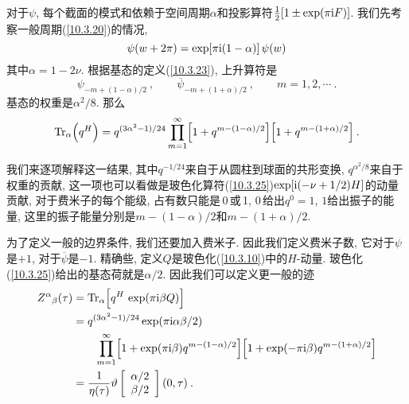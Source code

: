 对于$ \psi$, 每个截面的模式和依赖于空间周期$ \alpha $和投影算符$ \frac{1}{2}[1\pm\exp(\pi\mathrm{i} F)]$. 我们先考察一般周期(\ref{10.3.20})的情况,
\begin{equation}
    \psi(w+2\pi) =\exp[\pi\mathrm{i}(1-\alpha)]\,\psi(w) \label{10.7.4}
\end{equation}
其中$ \alpha=1-2\nu$. 根据基态的定义(\ref{10.3.23}), 上升算符是
\begin{equation}
    \psi_{-m+(1-\alpha)/2}\:,\qquad \overline{\psi}_{-m+(1+\alpha)/2}\:,   \qquad m=1,2,\cdots \:.\label{10.7.5}
\end{equation}
基态的权重是$ \alpha^{2}/8$. 那么
\begin{equation}
    \operatorname{Tr}_{\alpha}\Bigl(q^{H}\Bigr) = q^{(3\alpha^{2}-1)/24}\prod_{m=1}^{\infty}\Bigl[1+q^{m-(1-\alpha)/2}\Bigr]
    \Bigl[1+q^{m-(1+\alpha)/2}\Bigr]\:.\label{10.7.6}
\end{equation}
\begin{tcolorbox}
\noindent 我们来逐项解释这一结果, 其中$ q^{-1/24} $来自于从圆柱到球面的共形变换, $q^{\alpha^{2}/8} $来自于权重的贡献, 这一项也可以看做是玻色化算符(\ref{10.3.25})$ \exp[\mathrm{i}(-\nu+1/2)H] $的动量贡献, 对于费米子的每个能级, 占有数只能是\,0\,或\,1, 0\,给出$ q^{0}=1$, $1 $给出振子的能量, 这里的振子能量分别是$ m-(1-\alpha)/2 $和$ m-(1+\alpha)/2$.
\end{tcolorbox}
\noindent 为了定义一般的边界条件, 我们还要加入费米子. 因此我们定义费米子数, 它对于$ \psi $是$ +1$, 对于$ \overline{\psi} $是$ -1$. 精确些, 定义$ Q $是玻色化(\ref{10.3.10})中的$ H $-动量. 玻色化(\ref{10.3.25})给出的基态荷就是$ \alpha/2$. 因此我们可以定义更一般的迹
\begin{subequations}
    \begin{align}
        Z^{\alpha}{}_{\beta}(\tau) &= \operatorname{Tr}_{\alpha}\Bigl[q^{H}\,\exp(\pi\mi \beta Q)\Bigr]\label{10.7.7a} \\
        &= q^{(3\alpha^{2}-1)/24}\exp(\pi\mi\alpha\beta/2) \nonumber \\
        &\qquad \prod_{m=1}^{\infty}\Bigl[1+\exp(\pi\mi\beta)q^{m-(1-\alpha)/2}\Bigr]\Bigl[1+\exp(-\pi\mi\beta)q^{m-(1+\alpha)/2}\Bigr]\label{10.7.7b} \\
        & =\frac{1}{\eta(\tau)}\vartheta \left[
            \begin{array}{c}
            \alpha/2  \\ \beta/2
            \end{array}%
            \right] (0,\tau) \:.  \label{10.7.7c}
    \end{align} \label{10.7.7}
\end{subequations}


